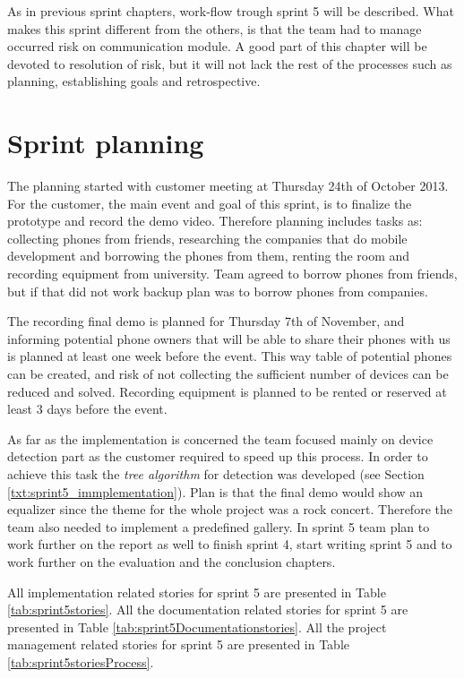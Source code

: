 \label{chap:sprint5}
As in previous sprint chapters, work-flow trough sprint 5 will be described. What makes this sprint different from the others, is that the team had to manage occurred risk on communication module. A good part of this chapter will be devoted to resolution of risk, but it will not lack the rest of the processes such as planning, establishing goals and retrospective.

\section{Sprint planning}

The planning started with customer meeting at Thursday 24th of October 2013. For the customer, the main event and goal of this sprint, is to finalize the prototype and record the demo video. Therefore planning includes tasks as: collecting phones from friends, researching the companies that do mobile development and borrowing the phones from them, renting the room and recording equipment from university. Team agreed to borrow phones from friends, but if that did not work backup plan was to borrow phones from companies.

The recording final demo is planned for Thursday 7th of November, and informing potential phone owners that will be able to share their phones with us is planned at least one week before the event. This way table of potential phones can be created, and risk of not collecting the sufficient number of devices can be reduced and solved. Recording equipment is planned to be rented or reserved at least 3 days before the event.

As far as the implementation is concerned the team focused mainly on device detection part as the customer required to speed up this process. In order to achieve this task the \textit{tree algorithm} for detection was developed (see Section \ref{txt:sprint5_immplementation}). Plan is that the final demo would show an equalizer since the theme for the whole project was a rock concert. Therefore the team also needed to implement a predefined gallery.
In sprint 5 team plan to work further on the report as well to finish sprint 4, start writing sprint 5 and to work further on the evaluation and the conclusion chapters.  

All implementation related stories for sprint 5 are presented in Table \ref{tab:sprint5stories}.
 All the documentation related stories for sprint 5 are presented in Table \ref{tab:sprint5Documentationstories}.
 All the project management related stories for sprint 5 are presented in Table \ref{tab:sprint5storiesProcess}.


